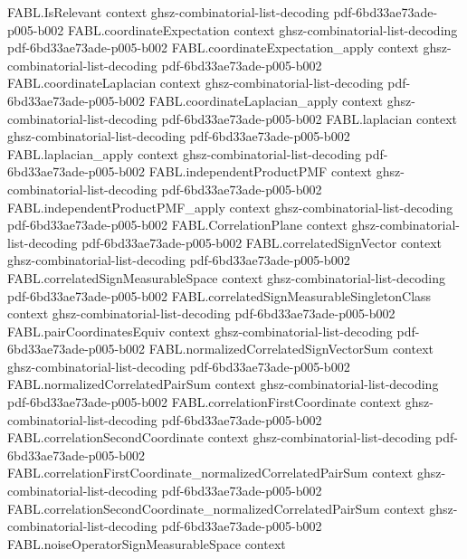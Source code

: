 \begin{theorem}
\proofstep
  {FABL.IsRelevant}
  {context}
  {ghsz-combinatorial-list-decoding}
  {pdf-6bd33ae73ade-p005-b002}
\proofstep
  {FABL.coordinateExpectation}
  {context}
  {ghsz-combinatorial-list-decoding}
  {pdf-6bd33ae73ade-p005-b002}
\proofstep
  {FABL.coordinateExpectation_apply}
  {context}
  {ghsz-combinatorial-list-decoding}
  {pdf-6bd33ae73ade-p005-b002}
\proofstep
  {FABL.coordinateLaplacian}
  {context}
  {ghsz-combinatorial-list-decoding}
  {pdf-6bd33ae73ade-p005-b002}
\proofstep
  {FABL.coordinateLaplacian_apply}
  {context}
  {ghsz-combinatorial-list-decoding}
  {pdf-6bd33ae73ade-p005-b002}
\proofstep
  {FABL.laplacian}
  {context}
  {ghsz-combinatorial-list-decoding}
  {pdf-6bd33ae73ade-p005-b002}
\proofstep
  {FABL.laplacian_apply}
  {context}
  {ghsz-combinatorial-list-decoding}
  {pdf-6bd33ae73ade-p005-b002}
\proofstep
  {FABL.independentProductPMF}
  {context}
  {ghsz-combinatorial-list-decoding}
  {pdf-6bd33ae73ade-p005-b002}
\proofstep
  {FABL.independentProductPMF_apply}
  {context}
  {ghsz-combinatorial-list-decoding}
  {pdf-6bd33ae73ade-p005-b002}
\proofstep
  {FABL.CorrelationPlane}
  {context}
  {ghsz-combinatorial-list-decoding}
  {pdf-6bd33ae73ade-p005-b002}
\proofstep
  {FABL.correlatedSignVector}
  {context}
  {ghsz-combinatorial-list-decoding}
  {pdf-6bd33ae73ade-p005-b002}
\proofstep
  {FABL.correlatedSignMeasurableSpace}
  {context}
  {ghsz-combinatorial-list-decoding}
  {pdf-6bd33ae73ade-p005-b002}
\proofstep
  {FABL.correlatedSignMeasurableSingletonClass}
  {context}
  {ghsz-combinatorial-list-decoding}
  {pdf-6bd33ae73ade-p005-b002}
\proofstep
  {FABL.pairCoordinatesEquiv}
  {context}
  {ghsz-combinatorial-list-decoding}
  {pdf-6bd33ae73ade-p005-b002}
\proofstep
  {FABL.normalizedCorrelatedSignVectorSum}
  {context}
  {ghsz-combinatorial-list-decoding}
  {pdf-6bd33ae73ade-p005-b002}
\proofstep
  {FABL.normalizedCorrelatedPairSum}
  {context}
  {ghsz-combinatorial-list-decoding}
  {pdf-6bd33ae73ade-p005-b002}
\proofstep
  {FABL.correlationFirstCoordinate}
  {context}
  {ghsz-combinatorial-list-decoding}
  {pdf-6bd33ae73ade-p005-b002}
\proofstep
  {FABL.correlationSecondCoordinate}
  {context}
  {ghsz-combinatorial-list-decoding}
  {pdf-6bd33ae73ade-p005-b002}
\proofstep
  {FABL.correlationFirstCoordinate_normalizedCorrelatedPairSum}
  {context}
  {ghsz-combinatorial-list-decoding}
  {pdf-6bd33ae73ade-p005-b002}
\proofstep
  {FABL.correlationSecondCoordinate_normalizedCorrelatedPairSum}
  {context}
  {ghsz-combinatorial-list-decoding}
  {pdf-6bd33ae73ade-p005-b002}
\proofstep
  {FABL.noiseOperatorSignMeasurableSpace}
  {context}

\end{theorem}
